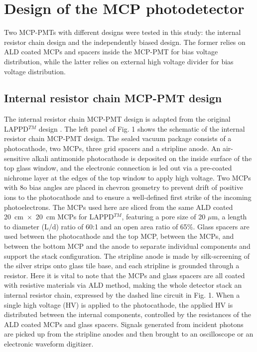 ﻿\documentclass[preprint,5p]{elsarticle}
\begin{document}
\section{Design of the MCP photodetector} \label{sec_design}
Two MCP-PMTs with different designs were tested in this study: the internal 
resistor chain design and the independently biased design. The former relies on 
ALD coated MCPs and spacers inside the MCP-PMT for bias voltage distribution, 
while the latter relies on external high voltage divider for bias voltage 
distribution.  

\subsection{Internal resistor chain MCP-PMT design} \label{}
The internal resistor chain MCP-PMT design is adapted from the original LAPPD$^{TM}$ 
design \cite{17}. The left panel of Fig. 1 shows the schematic of the internal 
resistor chain MCP-PMT design. The sealed vacuum package consists of a 
photocathode, two MCPs, three grid spacers and a stripline anode. An air-sensitive 
alkali antimonide photocathode is deposited on the inside surface of the top 
glass window, and the electronic connection is led out via a pre-coated 
nichrome layer at the edges of the top window to apply high voltage. Two MCPs 
with 8o bias angles are placed in chevron geometry to prevent drift of positive 
ions to the photocathode and to ensure a well-defined first strike of the 
incoming photoelectrons. The MCPs used here are sliced from the same ALD coated 
20~cm~$\times$~20~cm MCPs for LAPPD$^{TM}$, featuring a pore size of 20 $\mu$m, 
a length to diameter (L/d) ratio of 60:1 and an open area ratio of 65\%.  Glass 
spacers are used between the photocathode and the top MCP, between the MCPs, 
and between the bottom MCP and the anode to separate individual components and 
support the stack configuration. The stripline anode is made by silk-screening 
of the silver strips onto glass tile base, and each stripline is grounded 
through a resistor. Here it is vital to note that the MCPs and glass spacers 
are all coated with resistive materials via ALD method, making the whole 
detector stack an internal resistor chain, expressed by the dashed line circuit in 
Fig. 1. When a single high voltage (HV) is applied to the photocathode, the 
applied HV is distributed between the internal components, controlled by the 
resistances of the ALD coated MCPs and glass spacers. Signals generated from 
incident photons are picked up from the stripline anodes and then brought to 
an oscilloscope or an electronic waveform digitizer. 
\end{document}
